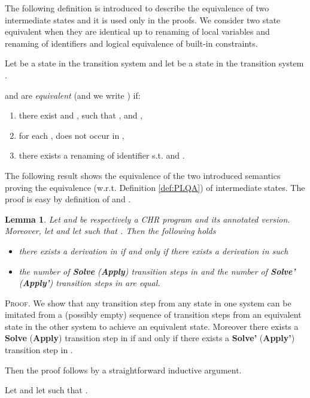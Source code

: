 \documentclass[final]{acmtrans2e}
\newtheorem{lemma}[theorem]{Lemma}
\begin{document}
The following definition is introduced to describe the equivalence
of two intermediate states and it is used only in the proofs.
We consider two state equivalent when they are identical up to
renaming of local variables and renaming of identifiers and logical
equivalence of built-in constraints.

\begin{definition}\label{def:PLQA}
 Let
  be a state in the transition system  and let   be a state in the transition system .

 and  are \emph{equivalent} (and we write
) if:
\begin{enumerate}
\item  there exist  and , such that ,  and ,
\item for each ,  does not occur in ,
\item there exists a renaming of identifier  s.t.  and .
\end{enumerate}
\end{definition}


The following result shows the equivalence of the two introduced
semantics proving the equivalence (w.r.t. Definition \ref{def:PLQA})
of intermediate states. The proof
is easy by definition of  and .


\begin{lemma}\label{lemma:intermequiv}
Let  and  be respectively a CHR program and its annotated version.
Moreover, let
 and let   such that
.
Then the following holds
\begin{itemize}
  \item there exists a derivation  in  if and only if
there exists a derivation  in  such  
  \item the number of \textbf{Solve} (\textbf{Apply}) transition steps in  and the number of \textbf{Solve'} (\textbf{Apply'}) transition steps in  are equal.
\end{itemize}
\end{lemma}
\textsc{Proof.}
 We show that any transition step from any state in one system can be imitated from a (possibly empty) sequence of  transition steps from an equivalent state in the other system to achieve an equivalent state.
 Moreover there exists a \textbf{Solve} (\textbf{Apply}) transition step in  if and only if there exists a  \textbf{Solve'} (\textbf{Apply'}) transition step in .

 Then the proof follows by a straightforward inductive argument.

Let 
and let   such that
.
\end{document}

